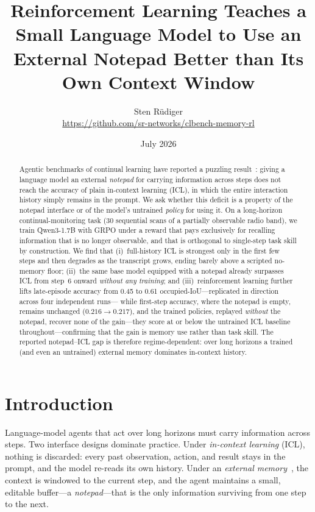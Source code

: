 \documentclass[11pt]{article}
\title{Reinforcement Learning Teaches a Small Language Model to Use an
External Notepad Better than Its Own Context Window}
\author{Sten R\"udiger\\[2pt]
\small \url{https://github.com/sr-networks/clbench-memory-rl}}
\date{July 2026}
\begin{document}
\maketitle

\begin{abstract}
Agentic benchmarks of continual learning have reported a puzzling
result~\cite{clbench}: giving a
language model an external \emph{notepad} for carrying information across steps does
not reach the accuracy of plain in-context learning (ICL), in which the entire
interaction history simply remains in the prompt. We ask whether this deficit is a
property of the notepad interface or of the model's untrained \emph{policy} for using
it. On a long-horizon continual-monitoring task (30 sequential scans of a partially
observable radio band), we train Qwen3-1.7B with GRPO under a reward that pays
exclusively for recalling information that is no longer observable, and that is
orthogonal to single-step task skill by construction. We find that (i)~full-history
ICL is strongest only in the first few steps and then degrades as the transcript
grows, ending barely above a scripted no-memory floor; (ii)~the same base model
equipped with a notepad already surpasses ICL from step~6 onward \emph{without any
training}; and (iii)~reinforcement learning further lifts late-episode accuracy from
0.45 to 0.61 occupied-IoU---replicated in direction across four independent runs---%
while first-step accuracy, where the notepad is empty, remains unchanged
($0.216 \rightarrow 0.217$), and the trained policies, replayed \emph{without} the
notepad, recover none of the gain---they score at or below the untrained ICL
baseline throughout---confirming that the gain is memory use rather than task
skill. The reported notepad--ICL gap is therefore regime-dependent: over long
horizons a trained (and even an untrained) external memory dominates in-context
history.
\end{abstract}

\section{Introduction}
\label{sec:intro}

Language-model agents that act over long horizons must carry information across
steps. Two interface designs dominate practice. Under \emph{in-context learning}
(ICL), nothing is discarded: every past observation, action, and result stays in the
prompt, and the model re-reads its own history. Under an \emph{external
memory}~\cite{memgpt}, the context is windowed to the current step, and the agent
maintains a small, editable buffer---a \emph{notepad}---that is the only information
surviving from one step to the next.
\end{document}
